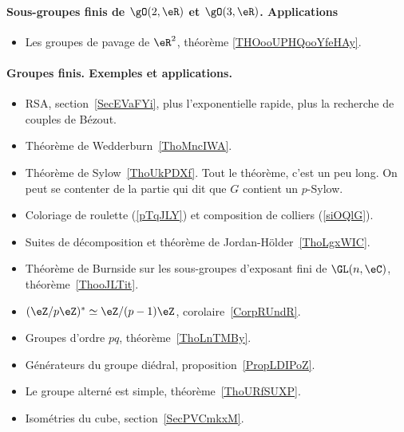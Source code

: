 \paragraph{Sous-groupes finis de \( \gO(2,\eR)\) et \( \gO(3,\eR)\). Applications}
\begin{itemize}
	\item Les groupes de pavage de \( \eR^2\), théorème \ref{THOooUPHQooYfeHAy}.
\end{itemize}
\paragraph{Groupes finis. Exemples et applications.}
\begin{itemize}
	\item RSA, section~\ref{SecEVaFYi}, plus l'exponentielle rapide, plus la recherche de couples de Bézout.
	\item Théorème de Wedderburn~\ref{ThoMncIWA}.
	\item Théorème de Sylow~\ref{ThoUkPDXf}. Tout le théorème, c'est un peu long. On peut se contenter de la partie qui dit que \( G\) contient un \( p\)-Sylow.
	\item Coloriage de roulette (\ref{pTqJLY}) et composition de colliers (\ref{siOQlG}).
	\item Suites de décomposition et théorème de Jordan-Hölder~\ref{ThoLgxWIC}.
	\item Théorème de Burnside sur les sous-groupes d'exposant fini de \( \GL(n,\eC)\), théorème~\ref{ThooJLTit}.
	\item \( (\eZ/p\eZ)^*\simeq \eZ/(p-1)\eZ\), corolaire~\ref{CorpRUndR}.
	\item Groupes d'ordre \( pq\), théorème~\ref{ThoLnTMBy}.
	\item Générateurs du groupe diédral, proposition~\ref{PropLDIPoZ}.
	\item Le groupe alterné est simple, théorème~\ref{ThoURfSUXP}.
	\item Isométries du cube, section~\ref{SecPVCmkxM}.
\end{itemize}
